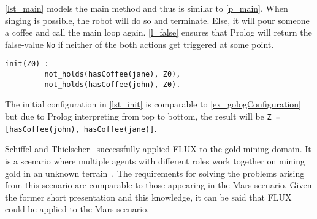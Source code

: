 \autoref{lst_main} models the main method and thus is similar to \autoref{p_main}.
When singing is possible, the robot will do so and terminate.
Else, it will pour someone a coffee and call the main loop again.
\autoref{l_false} ensures that Prolog will return the false-value \texttt{No} if neither of the both actions get triggered at some point.
\begin{lstlisting}[firstnumber=17, caption={Initial configuration.}, label=lst_init]
  init(Z0) :-
         not_holds(hasCoffee(jane), Z0),
         not_holds(hasCoffee(john), Z0).
\end{lstlisting}
The initial configuration in \autoref{lst_init} is comparable to \autoref{ex_gologConfiguration} but due to Prolog interpreting from top to bottom, the result will be \texttt{Z = [hasCoffee(john), hasCoffee(jane)]}.

Schiffel and Thielscher~\cite{schiffel_multi-agent_2007} successfully applied FLUX to the gold mining domain.
It is a scenario where multiple agents with different roles work together on mining gold in an unknown terrain~\cite{schiffel_multi-agent_2007}.
The requirements for solving the problems arising from this scenario are comparable to those appearing in the Mars-scenario.
Given the former short presentation and this knowledge, it can be said that FLUX could be applied to the Mars-scenario.
